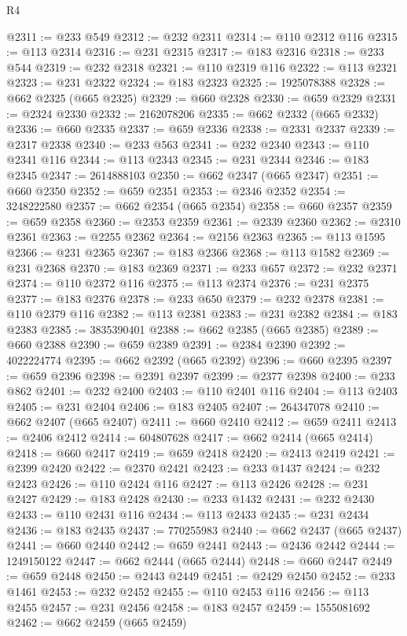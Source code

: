\begin{lexlean}{R4}
\begin{coremodule}
@2311 := @233 @549
@2312 := @232 @2311
@2314 := @110 @2312 @116
@2315 := @113 @2314
@2316 := @231 @2315
@2317 := @183 @2316
@2318 := @233 @544
@2319 := @232 @2318
@2321 := @110 @2319 @116
@2322 := @113 @2321
@2323 := @231 @2322
@2324 := @183 @2323
@2325 := 1925078388
@2328 := @662 @2325 (@665 @2325)
@2329 := @660 @2328
@2330 := @659 @2329
@2331 := @2324 @2330
@2332 := 2162078206
@2335 := @662 @2332 (@665 @2332)
@2336 := @660 @2335
@2337 := @659 @2336
@2338 := @2331 @2337
@2339 := @2317 @2338
@2340 := @233 @563
@2341 := @232 @2340
@2343 := @110 @2341 @116
@2344 := @113 @2343
@2345 := @231 @2344
@2346 := @183 @2345
@2347 := 2614888103
@2350 := @662 @2347 (@665 @2347)
@2351 := @660 @2350
@2352 := @659 @2351
@2353 := @2346 @2352
@2354 := 3248222580
@2357 := @662 @2354 (@665 @2354)
@2358 := @660 @2357
@2359 := @659 @2358
@2360 := @2353 @2359
@2361 := @2339 @2360
@2362 := @2310 @2361
@2363 := @2255 @2362
@2364 := @2156 @2363
@2365 := @113 @1595
@2366 := @231 @2365
@2367 := @183 @2366
@2368 := @113 @1582
@2369 := @231 @2368
@2370 := @183 @2369
@2371 := @233 @657
@2372 := @232 @2371
@2374 := @110 @2372 @116
@2375 := @113 @2374
@2376 := @231 @2375
@2377 := @183 @2376
@2378 := @233 @650
@2379 := @232 @2378
@2381 := @110 @2379 @116
@2382 := @113 @2381
@2383 := @231 @2382
@2384 := @183 @2383
@2385 := 3835390401
@2388 := @662 @2385 (@665 @2385)
@2389 := @660 @2388
@2390 := @659 @2389
@2391 := @2384 @2390
@2392 := 4022224774
@2395 := @662 @2392 (@665 @2392)
@2396 := @660 @2395
@2397 := @659 @2396
@2398 := @2391 @2397
@2399 := @2377 @2398
@2400 := @233 @862
@2401 := @232 @2400
@2403 := @110 @2401 @116
@2404 := @113 @2403
@2405 := @231 @2404
@2406 := @183 @2405
@2407 := 264347078
@2410 := @662 @2407 (@665 @2407)
@2411 := @660 @2410
@2412 := @659 @2411
@2413 := @2406 @2412
@2414 := 604807628
@2417 := @662 @2414 (@665 @2414)
@2418 := @660 @2417
@2419 := @659 @2418
@2420 := @2413 @2419
@2421 := @2399 @2420
@2422 := @2370 @2421
@2423 := @233 @1437
@2424 := @232 @2423
@2426 := @110 @2424 @116
@2427 := @113 @2426
@2428 := @231 @2427
@2429 := @183 @2428
@2430 := @233 @1432
@2431 := @232 @2430
@2433 := @110 @2431 @116
@2434 := @113 @2433
@2435 := @231 @2434
@2436 := @183 @2435
@2437 := 770255983
@2440 := @662 @2437 (@665 @2437)
@2441 := @660 @2440
@2442 := @659 @2441
@2443 := @2436 @2442
@2444 := 1249150122
@2447 := @662 @2444 (@665 @2444)
@2448 := @660 @2447
@2449 := @659 @2448
@2450 := @2443 @2449
@2451 := @2429 @2450
@2452 := @233 @1461
@2453 := @232 @2452
@2455 := @110 @2453 @116
@2456 := @113 @2455
@2457 := @231 @2456
@2458 := @183 @2457
@2459 := 1555081692
@2462 := @662 @2459 (@665 @2459)

\end{coremodule}
\end{lexlean}
